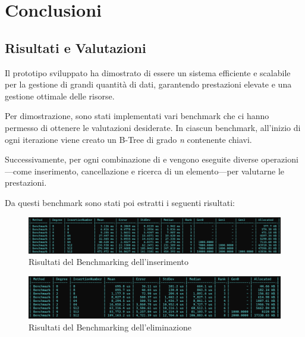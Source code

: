 \documentclass[12pt,a4paper,openright,twoside]{book}
\begin{document}
            

\chapter{Conclusioni}

    \section{Risultati e Valutazioni}
        Il prototipo sviluppato ha dimostrato di essere un sistema efficiente e scalabile per la gestione di grandi quantità di dati, garantendo prestazioni elevate e una gestione ottimale delle risorse.

        Per dimostrazione, sono stati implementati vari benchmark che ci hanno permesso di ottenere le valutazioni desiderate. In ciascun benchmark, all'inizio di ogni iterazione viene creato un B-Tree di grado \textit{n} contenente  chiavi.

        Successivamente, per ogni combinazione di  e  vengono eseguite diverse operazioni—come inserimento, cancellazione e ricerca di un elemento—per valutarne le prestazioni.

        Da questi benchmark sono stati poi estratti i seguenti risultati:

        \begin{figure} [h]
            \centering
            \includegraphics[width=1\linewidth]{figures/BenchmarkInsertion.png}
            \caption{Risultati del Benchmarking dell'inserimento}
            \label{fig:benchmarkA}
        \end{figure}

        \begin{figure} [h]
            \centering
            \includegraphics[width=1\linewidth]{figures/BenchmarkDelete.png}
            \caption{Risultati del Benchmarking dell'eliminazione}
            \label{fig:benchmarkB}
        \end{figure}
\end{document}
